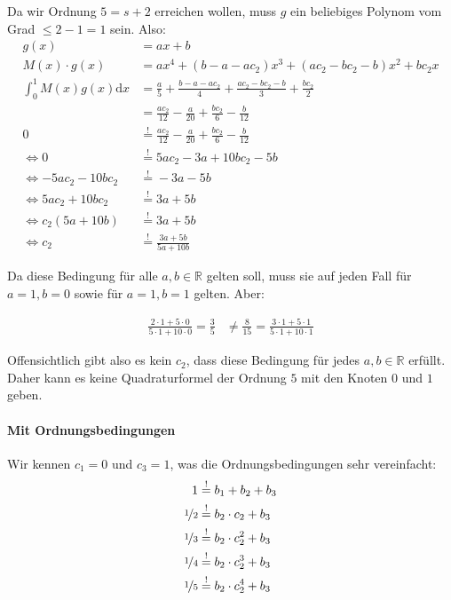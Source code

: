 Da wir Ordnung $5 = s + 2$ erreichen wollen, muss $g$ ein beliebiges
Polynom vom Grad $\leq 2-1 = 1$ sein. Also:
\begin{align}
    g(x) &= ax + b\\
    M(x) \cdot g(x) &= ax^4 + (b-a-ac_2)x^3 + (ac_2-bc_2-b)x^2 + b c_2 x\\
    \int_0^1 M(x) g(x) \mathrm{d} x &= \frac{a}{5} + \frac{b-a-ac_2}{4} + \frac{ac_2 - bc_2-b}{3} + \frac{b c_2}{2}\\
    &= \frac{a c_2}{12}-\frac{a}{20}+\frac{b c_2}{6}-\frac{b}{12}\\
    0 &\stackrel{!}{=}\frac{a c_2}{12}-\frac{a}{20}+\frac{b c_2}{6}-\frac{b}{12}\\
    \Leftrightarrow 0 &\stackrel{!}{=} 5 a c_2 - 3a + 10 b c_2 - 5 b\\
    \Leftrightarrow -5 a c_2 - 10 b c_2&\stackrel{!}{=}  - 3a - 5 b\\
    \Leftrightarrow 5 a c_2 + 10 b c_2&\stackrel{!}{=}  3a + 5 b\\
    \Leftrightarrow c_2(5 a + 10 b)&\stackrel{!}{=}  3a + 5 b\\
    \Leftrightarrow c_2 &\stackrel{!}{=}  \frac{3a + 5 b}{5 a + 10 b}
\end{align}

Da diese Bedingung für alle $a, b \in \mathbb{R}$ gelten soll, muss
sie auf jeden Fall für $a=1, b=0$ sowie für $a=1, b=1$ gelten. Aber:

\begin{align}
    \frac{2\cdot1+5\cdot0}{5\cdot1+10\cdot0} = \frac{3}{5} &\neq \frac{8}{15} = \frac{3\cdot1+5\cdot1}{5\cdot1+10\cdot1}
\end{align}

Offensichtlich gibt also es kein $c_2$, dass diese Bedingung für jedes $a,b \in \mathbb{R}$
erfüllt. Daher kann es keine Quadraturformel der Ordnung $5$ mit den Knoten
$0$ und $1$ geben.

\paragraph*{Mit Ordnungsbedingungen}
Wir kennen $c_1 = 0$ und $c_3=1$, was die Ordnungsbedingungen
sehr vereinfacht:
\begin{align}
    1 &\stackrel{!}{=} b_1 + b_2 + b_3\\
    \nicefrac{1}{2} &\stackrel{!}{=} b_2 \cdot c_2 + b_3 \label{eq:bed2}\\
    \nicefrac{1}{3} &\stackrel{!}{=} b_2 \cdot c_2^2 + b_3 \label{eq:bed3}\\
    \nicefrac{1}{4} &\stackrel{!}{=} b_2 \cdot c_2^3 + b_3\\
    \nicefrac{1}{5} &\stackrel{!}{=} b_2 \cdot c_2^4 + b_3
\end{align}

